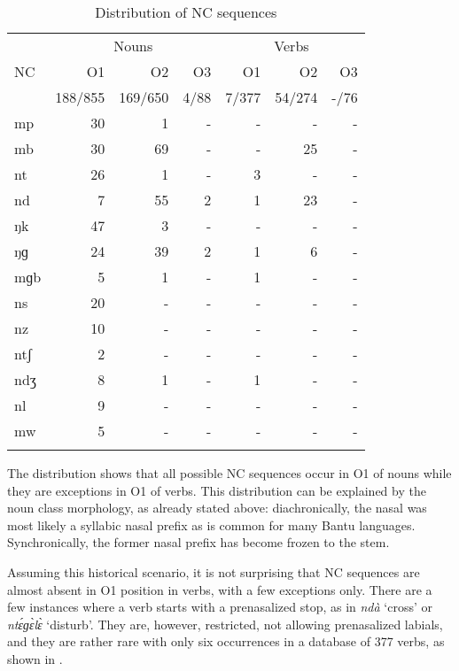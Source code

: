 \begin{table}
\begin{tabular}{l rrr  rrr}
 \lsptoprule
  &  \multicolumn{3}{c}{Nouns} & \multicolumn{3}{c}{Verbs} \\\cmidrule(lr){2-4}\cmidrule(lr){5-7}
{NC}  & {O1}  & {O2}  & {O3 }  &  {O1} & {O2}  & {O3}   \\
   & 188/855 & 169/650 & 4/88 & 7/377 & 54/274 & -/76 \\  \midrule
         mp & 30 & 1 & -  & - & - & -  \\ 
          mb &  30    &   69  & - &   - & 25 &  - \\
         nt  &   26   &  1  &  - & 3 & - & -   \\
         nd  &    7  &  55  & 2 &  1 & 23 & -    \\ 
         ŋk   &   47   &  3  &  -  & - & - & - \\
         ŋɡ  &  24    & 39   & 2 & 1  & 6 & - \\
	mɡb & 5    &  1   & - &     1  &  - & - \\
	ns	& 20  & -   &   -  & - &  - &  - \\
	nz	& 10 & - & - & - & - & - \\
         ntʃ	&  2 & - & - & - & - & - \\
         ndʒ	& 8 & 1 & - & 1 & - & - \\
         nl	& 9 & - & - & - & - & - \\
         mw	& 5 & - & - & - & - & - \\
 \lspbottomrule
\end{tabular}
\caption{Distribution of NC sequences}
\label{Tab:PreCons}
\end{table}

The distribution shows that all possible NC sequences occur in O1 of nouns while they are exceptions in O1 of verbs. This distribution can be explained by the noun class morphology, as already stated above: diachronically, the nasal was most likely a syllabic nasal prefix as is common for many Bantu languages. Synchronically, the former nasal prefix has become frozen to the stem. 

Assuming this historical scenario, it is not surprising that NC sequences are almost absent in O1 position in verbs, with a few exceptions only. There are a few instances where a verb starts with a prenasalized stop, as in {\itshape ndà} `cross' or {\itshape ntɛ́ɡɛ̀lɛ̀} `disturb'. They are, however, restricted, not allowing prenasalized labials, and they are rather rare with only six occurrences in a database of 377 verbs, as shown in .

